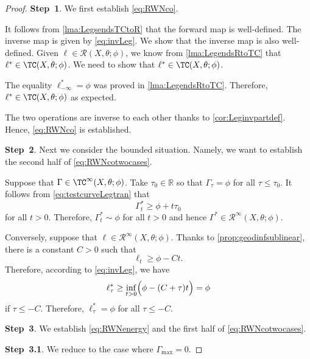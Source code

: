\begin{proof}
    \textbf{Step~1}. We first establish \eqref{eq:RWNco}.

    It follows from \cref{lma:LegsendsTCtoR} that the forward map is well-defined. The inverse map is given by \eqref{eq:invLeg}. We show that the inverse map is also well-defined. Given $\ell\in \mathcal{R}(X,\theta;\phi)$, we know from \cref{lma:LegendsRtoTC} that $\ell^*\in \TC(X,\theta;\phi)$.
    We need to show that $\ell^*\in \TC(X,\theta;\phi)$.

    The equality $\ell^*_{-\infty}=\phi$ was proved in \cref{lma:LegendsRtoTC}. Therefore, $\ell^*\in \TC(X,\theta;\phi)$ as expected.

    The two operations are inverse to each other thanks to \cref{cor:Leginvpartdef}. Hence, \eqref{eq:RWNco} is established.

    \textbf{Step~2}.
    Next we consider the bounded situation. Namely, we want to establish the second half of \eqref{eq:RWNcotwocases}.

    Suppose that $\Gamma\in \TC^{\infty}(X,\theta;\phi)$. Take $\tau_0\in \mathbb{R}$ so that $\Gamma_{\tau}=\phi$ for all $\tau\leq \tau_0$. It follows from \eqref{eq:testcurveLegtran} that
    \[
    \Gamma_t^*\geq \phi+t\tau_0
    \]
    for all $t>0$. Therefore, $\Gamma^*_t\sim \phi$ for all $t>0$ and hence $\Gamma^*\in \mathcal{R}^{\infty}(X,\theta;\phi)$.

    Conversely, suppose that $\ell\in \mathcal{R}^{\infty}(X,\theta;\phi)$. Thanks to \cref{prop:geodinfsublinear}, there is a constant $C>0$ such that
    \[
    \ell_t\geq \phi-Ct.
    \]
    Therefore, according to \eqref{eq:invLeg}, we have
    \[
    \ell^*_{\tau}\geq \inf_{t>0} \Bigl( \phi-(C+\tau)t \Bigr)=\phi
    \]
    if $\tau\leq -C$. Therefore, $\ell^*_{\tau}=\phi$ for all $\tau\leq -C$.

    \textbf{Step~3}. We establish \eqref{eq:RWNenergy} and the first half of \eqref{eq:RWNcotwocases}.

    \textbf{Step~3.1}. We reduce to the case where $\Gamma_{\max}=0$.


\end{proof}
